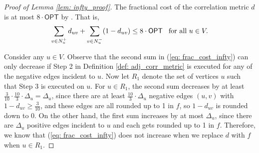 \begin{proof}[Proof of Lemma \ref{lem: infty_proof}]
    The fractional cost of the correlation metric $d$ is at most $8 \cdot \textsf{OPT}$ by \cite{DMN23}. That is,
    \begin{equation} \label{eq: frac_cost_infty}
        \sum_{v \in N_u^+} d_{uv} + \sum_{v \in N_u^-} (1-d_{uv}) \leq 8 \cdot \textsf{OPT} \hspace{0.3cm} \text{for all } u \in V.
    \end{equation}

    Consider any $u \in V$. Observe that the second sum in (\ref{eq: frac_cost_infty}) can only decrease if Step 2 in Definition \ref{def: adj_corr_metric} is executed for any of the negative edges incident to $u$. Now let $R_1$ denote the set of vertices $u$ such that Step 3 is executed on $u$. For $u \in R_1$, the  second sum decreases by at least $\frac{3}{10} \cdot \frac{10}{3} \cdot \Delta_u = \Delta_u $, since there are at least $\frac{10}{3}\cdot \Delta_u$ negative edges $(u,v)$ with $1-d_{uv} \geq \frac{3}{10}$, and these edges are all rounded up  to 1 in $f$, so $1-d_{uv}$ is rounded down to 0. On the other hand, the first sum increases by at most $\Delta_u$, since there are $\Delta_u$ positive edges incident to $u$ and each gets rounded up to 1 in $f$. Therefore, we know that (\ref{eq: frac_cost_infty}) does not increase when we replace $d$ with $f$ when $u \in R_1$. 


\end{proof}
